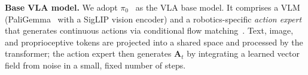 %
%

\textbf{Base VLA model.}
We adopt $\pi_0$~\cite{black2410pi0} as the VLA base model. It comprises a VLM (PaliGemma~\cite{beyer2024paligemma} with a SigLIP vision encoder) and a robotics-specific \emph{action expert} that generates continuous actions via conditional flow matching~\cite{lipman2022flow}. Text, image, and proprioceptive tokens are projected into a shared space and processed by the transformer; the action expert then generates $\mathbf{A}_t$ by integrating a learned vector field from noise in a small, fixed number of steps.




